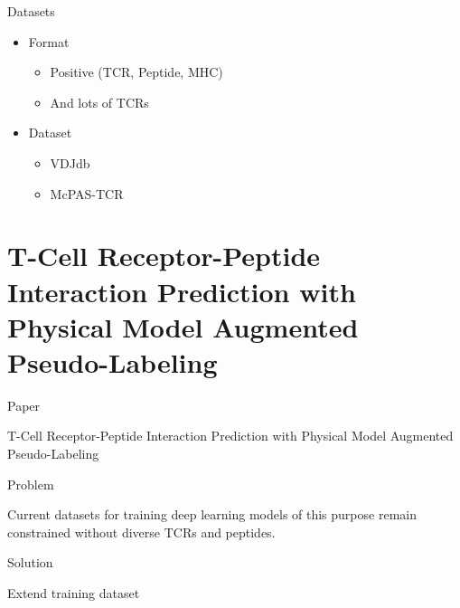 \documentclass[aspectratio=1610,xcolor={dvipsnames},hyperref={colorlinks,unicode,linkcolor=violet,anchorcolor=blueviolet,citecolor=YellowOrange,filecolor=black,urlcolor=Aquamarine}]{beamer}
\begin{document}
\begin{frame}[label={sec:org70c4332}]{Datasets}
\begin{itemize}
\item Format
\begin{itemize}
\item Positive (TCR, Peptide, MHC)
\item And lots of TCRs
\end{itemize}
\item Dataset
\begin{itemize}
\item VDJdb 
\item McPAS-TCR 
\end{itemize}
\end{itemize}
\end{frame}

\section{T-Cell Receptor-Peptide Interaction Prediction with Physical Model Augmented Pseudo-Labeling}
\label{sec:org4758d7b}

\begin{frame}[label={sec:orgd7716ec}]{Paper}
\begin{center}
\LARGE T-Cell Receptor-Peptide Interaction Prediction with Physical Model Augmented Pseudo-Labeling \normalsize {}
\end{center}
\end{frame}

\begin{frame}[label={sec:org0a46d23}]{Problem}
\begin{center}
\Large Current datasets for training deep learning models of this purpose remain constrained without diverse TCRs and peptides.
\end{center}
\end{frame}

\begin{frame}[label={sec:orgea0d18d}]{Solution}
\begin{center}
\Large Extend training dataset
\end{center}
\end{frame}
\end{document}
